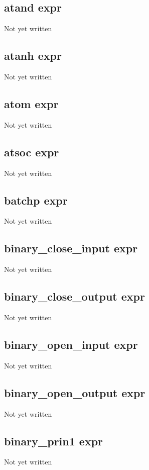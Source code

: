 \documentclass[a4paper,11pt]{article}
\begin{document}
{\subsection{\ttfamily atand expr}
   Not yet written

\subsection{\ttfamily atanh expr}
   Not yet written

\subsection{\ttfamily atom expr}
   Not yet written

\subsection{\ttfamily atsoc expr}
   Not yet written

\subsection{\ttfamily batchp expr}
   Not yet written

\subsection{\ttfamily binary\_close\_input expr}
   Not yet written

\subsection{\ttfamily binary\_close\_output expr}
   Not yet written

\subsection{\ttfamily binary\_open\_input expr}
   Not yet written

\subsection{\ttfamily binary\_open\_output expr}
   Not yet written

\subsection{\ttfamily binary\_prin1 expr}
   Not yet written

}
\end{document}
